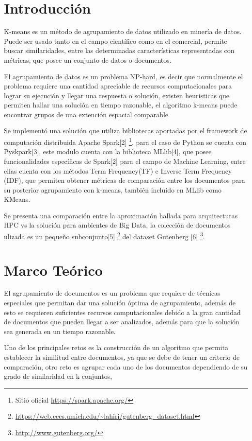 \section{Introducción}
K-means es un método de agrupamiento de datos utilizado en minería de datos.
Puede ser usado tanto en el campo científico como en el comercial, permite
buscar similaridades, entre las determinadas características representadas
con métricas, que posee un conjunto de datos o documentos.

El agrupamiento de datos es un problema NP-hard, es decir que normalmente el
problema requiere una cantidad apreciable de recursos computacionales para lograr
su ejecución y llegar una respuesta o solución, existen heuristicas que permiten
hallar una solución en tiempo razonable, el algoritmo k-means puede encontrar grupos de una
extención espacial comparable


Se implementó una solución que utiliza bibliotecas aportadas por el framework
de computación distribuida Apache Spark[2]
\footnote{Sitio oficial \url{https://spark.apache.org/}},
para el caso de Python se cuenta con Pyskpark[3], este modulo cuenta con la
biblioteca MLlib[4], que posee funcionalidades específicas de Spark[2]
para el campo de Machine Learning, entre ellas cuenta con los
métodos Term Frequency(TF) e Inverse Term Frequency (IDF), que permiten
obtener métricas de comparación entre los documentos para su posterior
agrupamiento con k-means, también incluido en MLlib como KMeans.

Se presenta una comparación entre la aproximación hallada para arquitecturas HPC
vs la solución para ambientes de Big Data, la colección de documentos ulizada
es un pequeño subconjunto[5]
\footnote{\url{https://web.eecs.umich.edu/~lahiri/gutenberg_dataset.html}}
del dataset Gutenberg [6] \footnote{\url{http://www.gutenberg.org/}}.

\section{Marco Teórico}
El agrupamiento de documentos es un problema que requiere de técnicas especiales
que permitan dar una solución óptima de agrupamiento, además de esto se requieren
suficientes recursos computacionales debido a la gran cantidad de documentos
que pueden llegar a ser analizados, además para que la solución sea generada
en un tiempo razonable.

Uno de los principales retos es la construcción de un algoritmo que permita
establecer la similitud entre documentos, ya que se debe de tener un criterio
de comparación, otro reto es agrupar cada uno de los documentos dependiendo
de su grado de similaridad en k conjuntos,

